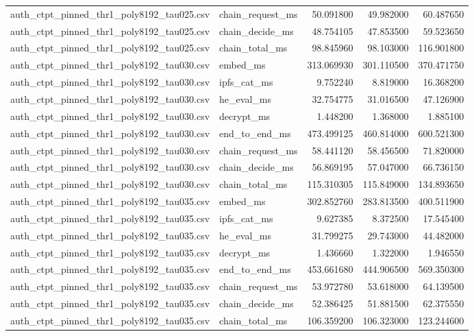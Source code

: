 \begin{tabular}{llrrr}
auth_ctpt_pinned_thr1_poly8192_tau025.csv & chain_request_ms & 50.091800 & 49.982000 & 60.487650 \\
auth_ctpt_pinned_thr1_poly8192_tau025.csv & chain_decide_ms & 48.754105 & 47.853500 & 59.523650 \\
auth_ctpt_pinned_thr1_poly8192_tau025.csv & chain_total_ms & 98.845960 & 98.103000 & 116.901800 \\
auth_ctpt_pinned_thr1_poly8192_tau030.csv & embed_ms & 313.069930 & 301.110500 & 370.471750 \\
auth_ctpt_pinned_thr1_poly8192_tau030.csv & ipfs_cat_ms & 9.752240 & 8.819000 & 16.368200 \\
auth_ctpt_pinned_thr1_poly8192_tau030.csv & he_eval_ms & 32.754775 & 31.016500 & 47.126900 \\
auth_ctpt_pinned_thr1_poly8192_tau030.csv & decrypt_ms & 1.448200 & 1.368000 & 1.885100 \\
auth_ctpt_pinned_thr1_poly8192_tau030.csv & end_to_end_ms & 473.499125 & 460.814000 & 600.521300 \\
auth_ctpt_pinned_thr1_poly8192_tau030.csv & chain_request_ms & 58.441120 & 58.456500 & 71.820000 \\
auth_ctpt_pinned_thr1_poly8192_tau030.csv & chain_decide_ms & 56.869195 & 57.047000 & 66.736150 \\
auth_ctpt_pinned_thr1_poly8192_tau030.csv & chain_total_ms & 115.310305 & 115.849000 & 134.893650 \\
auth_ctpt_pinned_thr1_poly8192_tau035.csv & embed_ms & 302.852760 & 283.813500 & 400.511900 \\
auth_ctpt_pinned_thr1_poly8192_tau035.csv & ipfs_cat_ms & 9.627385 & 8.372500 & 17.545400 \\
auth_ctpt_pinned_thr1_poly8192_tau035.csv & he_eval_ms & 31.799275 & 29.743000 & 44.482000 \\
auth_ctpt_pinned_thr1_poly8192_tau035.csv & decrypt_ms & 1.436660 & 1.322000 & 1.946550 \\
auth_ctpt_pinned_thr1_poly8192_tau035.csv & end_to_end_ms & 453.661680 & 444.906500 & 569.350300 \\
auth_ctpt_pinned_thr1_poly8192_tau035.csv & chain_request_ms & 53.972780 & 53.618000 & 64.139500 \\
auth_ctpt_pinned_thr1_poly8192_tau035.csv & chain_decide_ms & 52.386425 & 51.881500 & 62.375550 \\
auth_ctpt_pinned_thr1_poly8192_tau035.csv & chain_total_ms & 106.359200 & 106.323000 & 123.244600 \\

\end{tabular}
